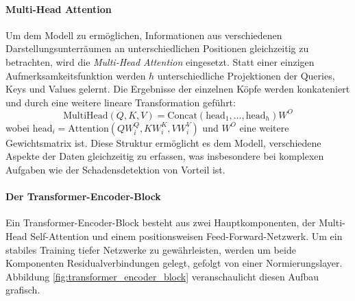 \paragraph{Multi-Head Attention}
Um dem Modell zu ermöglichen, Informationen aus verschiedenen Darstellungsunterräumen an unterschiedlichen Positionen gleichzeitig zu betrachten, wird die \emph{Multi-Head Attention} eingesetzt. Statt einer einzigen Aufmerksamkeitsfunktion werden $h$ unterschiedliche Projektionen der Queries, Keys und Values gelernt. Die Ergebnisse der einzelnen Köpfe werden konkateniert und durch eine weitere lineare Transformation geführt:
\begin{equation}
    \text{MultiHead}(Q, K, V) = \text{Concat}(\text{head}_1, \dots, \text{head}_h)W^O
\end{equation}
wobei $\text{head}_i = \text{Attention}(QW_i^Q, KW_i^K, VW_i^V)$ und $W^O$ eine weitere Gewichtsmatrix ist. Diese Struktur ermöglicht es dem Modell, verschiedene Aspekte der Daten gleichzeitig zu erfassen, was insbesondere bei komplexen Aufgaben wie der Schadensdetektion von Vorteil ist.

\paragraph{Der Transformer-Encoder-Block}
Ein Transformer-Encoder-Block besteht aus zwei Hauptkomponenten, der Multi-Head Self-Attention und einem positionsweisen Feed-Forward-Netzwerk. Um ein stabiles Training tiefer Netzwerke zu gewährleisten, werden um beide Komponenten Residualverbindungen gelegt, gefolgt von einer Normierungslayer. Abbildung \ref{fig:transformer_encoder_block} veranschaulicht diesen Aufbau grafisch.

